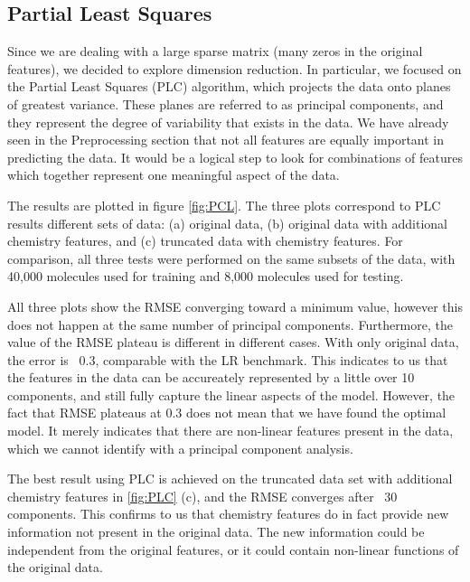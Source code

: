 \documentclass[11pt]{article}
\begin{document}
    \subsection{Partial Least Squares}
Since we are dealing with a large sparse matrix (many zeros in the original features), we decided to explore dimension reduction. In particular, we focused on the Partial Least Squares (PLC) algorithm, which projects the data onto planes of greatest variance. These planes are referred to as principal components, and they represent the degree of variability that exists in the data. We have already seen in the Preprocessing section that not all features are equally important in predicting the data. It would be a logical step to look for combinations of features which together represent one meaningful aspect of the data. 

The results are plotted in figure \ref{fig:PCL}.  The three plots correspond to PLC results different sets of data: (a) original data, (b) original data with additional chemistry features, and (c) truncated data with chemistry features. For comparison, all three tests were performed on the same subsets of the data, with 40,000 molecules used for training and 8,000 molecules used for testing. 

All three plots show the RMSE converging toward a minimum value, however this does not happen at the same number of principal components. Furthermore, the value of the RMSE plateau is different in different cases. With only original data, the error is ~0.3, comparable with the LR benchmark. This indicates to us that the features in the data can be accureately represented by a little over 10 components, and still fully capture the linear aspects of the model. However, the fact that RMSE plateaus at 0.3 does not mean that we have found the optimal model. It merely indicates that there are non-linear features present in the data, which we cannot identify with a principal component analysis. 

The best result using PLC is achieved on the truncated data set with additional chemistry features in \ref{fig:PLC} (c), and the RMSE converges after ~30 components. This confirms to us that chemistry features do in fact provide new information not present in the original data. The new information could be independent from the original features, or it could contain non-linear functions of the original data. 
\end{document}
